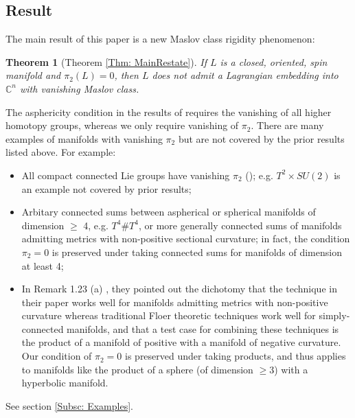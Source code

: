 \documentclass[10pt]{amsart}
\numberwithin{equation}{section}
\theoremstyle{plain}
\newtheorem{theorem}{Theorem}[section]
\theoremstyle{definition}
\theoremstyle{remark}
\numberwithin{equation}{section}
\newcommand{\C}{\mathbb{C}}
\begin{document}
\subsection{Result}
The main result of this paper is a new Maslov class rigidity phenomenon:
\begin{theorem}[Theorem \ref{Thm: MainRestate}]\label{Thm: Main}
	If $L$ is a closed, oriented, spin manifold and $\pi_2(L)=0$, then $L$ does not admit a Lagrangian embedding into $\C^n$ with vanishing Maslov class.
\end{theorem}
The asphericity condition in the results of \cite{ViterboTori,FukayaLagrangian,Irie2} requires the vanishing of all higher homotopy groups, whereas we only require vanishing of $\pi_2$. There are many examples of manifolds with vanishing $\pi_2$ but are not covered by the prior results listed above. For example:
\begin{itemize}
	\item All compact connected Lie groups have vanishing $\pi_2$ (\cite{BottLieGroup}); e.g. $T^2\times SU(2)$ is an example not covered by prior results;
	\item Arbitary connected sums between aspherical or spherical manifolds of dimension $\geq$ 4, e.g. $T^4\# T^4$, or more generally connected sums of manifolds admitting metrics with non-positive sectional curvature; in fact, the condition $\pi_2=0$ is preserved under taking connected sums for manifolds of dimension at least 4;
	\item In Remark 1.23 (a) \cite{CieliebakMohnke}, they pointed out the dichotomy that the technique in their paper works well for manifolds admitting metrics with non-positive curvature whereas traditional Floer theoretic techniques work well for simply-connected manifolds, and that a test case for combining these techniques is the product of a manifold of positive with a manifold of negative curvature.
	Our condition of $\pi_2=0$ is preserved under taking products, and thus applies to manifolds like the product of a sphere (of dimension $\geq 3$) with a hyperbolic manifold.
\end{itemize}
See section \ref{Subsc: Examples}.
\end{document}

